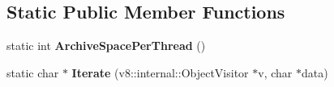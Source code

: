 \subsection*{Static Public Member Functions}
\begin{DoxyCompactItemize}
\item 
static int {\bfseries Archive\+Space\+Per\+Thread} ()\hypertarget{classv8_1_1internal_1_1_handle_scope_implementer_ae1a88c356c5413fc94977f71ef5915e7}{}\label{classv8_1_1internal_1_1_handle_scope_implementer_ae1a88c356c5413fc94977f71ef5915e7}

\item 
static char $\ast$ {\bfseries Iterate} (v8\+::internal\+::\+Object\+Visitor $\ast$v, char $\ast$data)\hypertarget{classv8_1_1internal_1_1_handle_scope_implementer_a752b290babe1b9cb958f60bf84f6ad09}{}\label{classv8_1_1internal_1_1_handle_scope_implementer_a752b290babe1b9cb958f60bf84f6ad09}

\end{DoxyCompactItemize}
